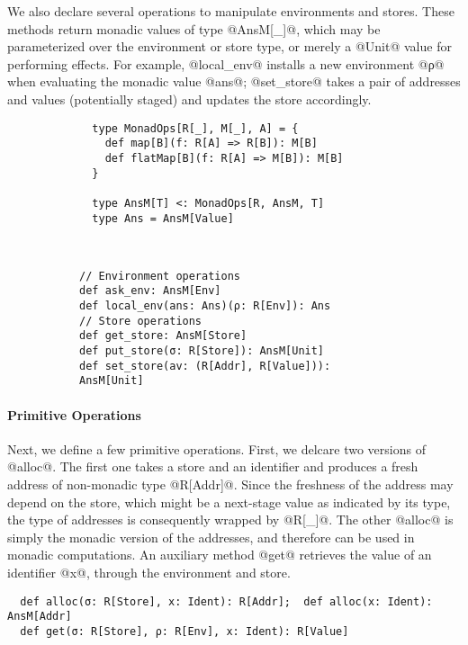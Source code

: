 We also declare several operations to manipulate environments and
stores. These methods return monadic values of type @AnsM[_]@, which
may be parameterized over the environment or store type, or merely a @Unit@
value for performing effects. For example, @local_env@ installs a new environment
@ρ@ when evaluating the monadic value @ans@; @set_store@ takes a pair of
addresses and values (potentially staged) and updates the store accordingly.

\begin{figure}[h!]
  \centering
\vspace{-1em}
  \begin{subfigure}[b]{0.45\textwidth}
    \begin{lstlisting}
  type MonadOps[R[_], M[_], A] = {
    def map[B](f: R[A] => R[B]): M[B]
    def flatMap[B](f: R[A] => M[B]): M[B]
  }

  type AnsM[T] <: MonadOps[R, AnsM, T]
  type Ans = AnsM[Value]
    \end{lstlisting}
  \end{subfigure}
  ~
  \begin{subfigure}[b]{0.55\textwidth}
    \begin{lstlisting}
// Environment operations
def ask_env: AnsM[Env]
def local_env(ans: Ans)(ρ: R[Env]): Ans
// Store operations
def get_store: AnsM[Store]
def put_store(σ: R[Store]): AnsM[Unit]
def set_store(av: (R[Addr], R[Value])): AnsM[Unit]
    \end{lstlisting}
  \end{subfigure}
\end{figure}
\vspace{-1em}

\paragraph{Primitive Operations} Next, we define a few primitive operations.
First, we delcare two versions of @alloc@. The first one takes a store and an
identifier and produces a fresh address of non-monadic type @R[Addr]@. Since
the freshness of the address may depend on the store, which might be a
next-stage value as indicated by its type, the type of addresses is
consequently wrapped by @R[_]@. The other @alloc@ is simply the monadic version
of the addresses, and therefore can be used in monadic computations.
An auxiliary method @get@ retrieves the value of an identifier @x@, through the
environment and store.
\begin{lstlisting}
  def alloc(σ: R[Store], x: Ident): R[Addr];  def alloc(x: Ident): AnsM[Addr]
  def get(σ: R[Store], ρ: R[Env], x: Ident): R[Value]
\end{lstlisting}

